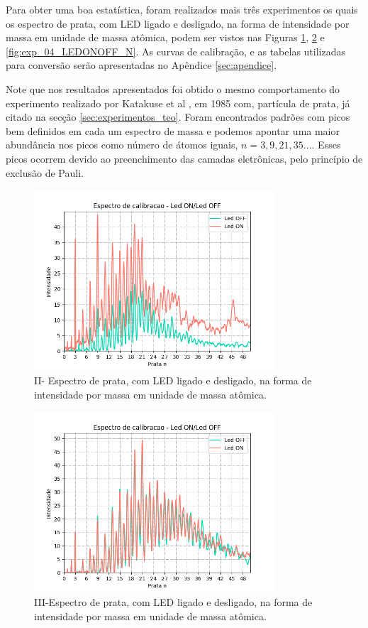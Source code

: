 Para obter uma boa estatística, foram realizados mais três experimentos os quais os espectro de prata, com LED ligado e desligado, na forma de intensidade por massa em unidade de massa atômica, podem ser vistos nas Figuras \ref{fig:exp_02_LEDONOFF_N}, \ref{fig:exp_03_LEDONOFF_N} e \ref{fig:exp_04_LEDONOFF_N}. As curvas de calibração, e as tabelas utilizadas para conversão serão apresentadas no Apêndice \ref{sec:apendice}.

Note que nos resultados apresentados foi obtido o mesmo comportamento do experimento realizado por Katakuse et al \cite{KATAKUSE1985229}, em 1985 com, partícula de prata, já citado na secção \ref{sec:experimentos_teo}. Foram encontrados padrões com picos bem definidos em cada um espectro de massa e podemos apontar uma maior  abundância nos picos como número de átomos iguais, $n= 3,9,21,35...$. Esses picos ocorrem devido ao preenchimento das camadas eletrônicas, pelo princípio de exclusão de Pauli.

\begin{figure}
  \centering  
  \includegraphics[width=0.8\textwidth]{exp_02/LED_ON_Led_OFF_espectro_calib_prata_N_.png}
  \caption{II- Espectro de prata, com LED ligado e desligado, na forma de intensidade por massa em unidade de massa atômica.}
  \label{fig:exp_02_LEDONOFF_N}
\end{figure}

\begin{figure}
  \centering  
  \includegraphics[width=0.8\textwidth]{exp_03/LED_ON_Led_OFF_espectro_calib_prata_N_.png}
  \caption{III-Espectro de prata, com LED ligado e desligado, na forma de intensidade por massa em unidade de massa atômica.}
  \label{fig:exp_03_LEDONOFF_N}
\end{figure}

